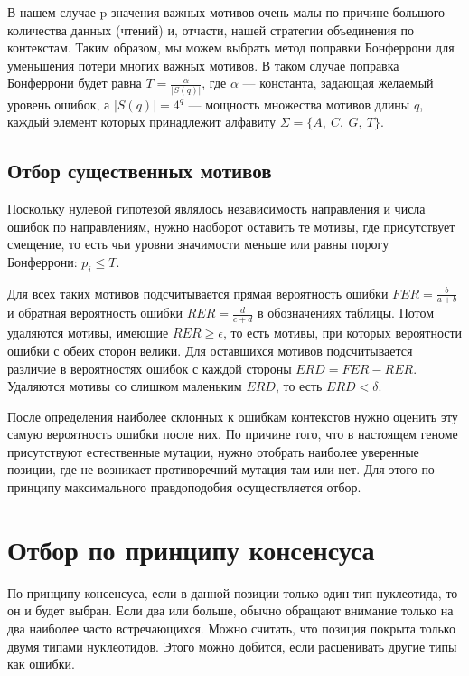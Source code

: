 В нашем случае p-значения важных мотивов очень малы по причине большого количества данных (чтений) и, отчасти, нашей стратегии объединения по контекстам. Таким образом, мы можем выбрать метод поправки Бонферрони для уменьшения потери многих важных мотивов. В таком случае поправка Бонферрони будет равна $T = \frac {\alpha} {|S(q)|}$, где $\alpha$ --- константа, задающая желаемый уровень ошибок, а $|S(q)| = 4^q$ --- мощность множества мотивов длины $q$, каждый элемент которых принадлежит алфавиту ${\Sigma} = \{A,\ C,\ G,\ T\}$.   

\subsection{Отбор существенных мотивов}

Поскольку нулевой гипотезой являлось независимость направления и числа ошибок по направлениям, нужно наоборот оставить те мотивы, где присутствует смещение, то есть чьи уровни значимости меньше или равны порогу Бонферрони: $p_i \le T$. 

Для всех таких мотивов подсчитывается прямая вероятность ошибки $FER = \frac {b} {a+b}$ и обратная вероятность ошибки $RER= \frac {d} {c+d}$ в обозначениях таблицы. Потом удаляются мотивы, имеющие $RER \ge \epsilon$, то есть мотивы, при которых вероятности ошибки с обеих сторон велики. Для оставшихся мотивов подсчитывается различие в вероятностях ошибок с каждой стороны $ERD = FER - RER$. Удаляются мотивы со слишком маленьким $ERD$, то есть $ERD < \delta$.

После определения наиболее склонных к ошибкам контекстов нужно оценить эту самую вероятность ошибки после них. По причине того, что в настоящем геноме присутствуют естественные мутации, нужно отобрать наиболее уверенные позиции, где не возникает противоречний мутация там или нет.  
Для этого по принципу максимального правдоподобия осуществляется отбор.

\section {Отбор по принципу консенсуса}

По принципу консенсуса, если в данной позиции только один тип нуклеотида, то он и будет выбран. Если два или больше, обычно обращают внимание только на два наиболее часто встречающихся. Можно считать, что позиция покрыта только двумя типами нуклеотидов. Этого можно добится, если расценивать другие типы как ошибки. 

